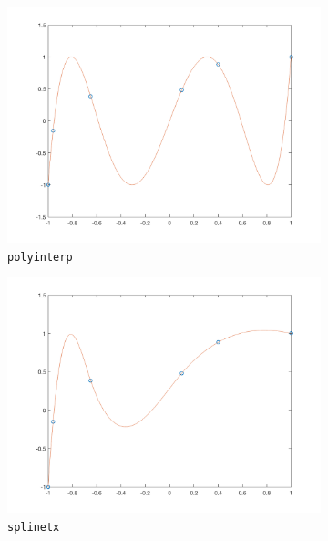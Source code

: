 \documentclass[10pt]{report}
\begin{document}
\begin{enumerate}
\begin{enumerate}
\begin{figure}[ht]
\begin{subfigure}[b]{0.5\linewidth}
				\centering
				\includegraphics[width=\linewidth]{polyinterp.png} 
				\vspace{-5ex}
				\caption*{\texttt{polyinterp}}
			\end{subfigure}
			\begin{subfigure}[b]{0.5\linewidth}
				\centering
				\includegraphics[width=\linewidth]{splinetx.png} 
				\vspace{-5ex}
				\caption*{\texttt{splinetx}}
			\end{subfigure}
			\begin{subfigure}[b]{0.5\linewidth}
				\centering

\end{subfigure}
\end{figure}
\end{enumerate}
\end{enumerate}
\end{document}

